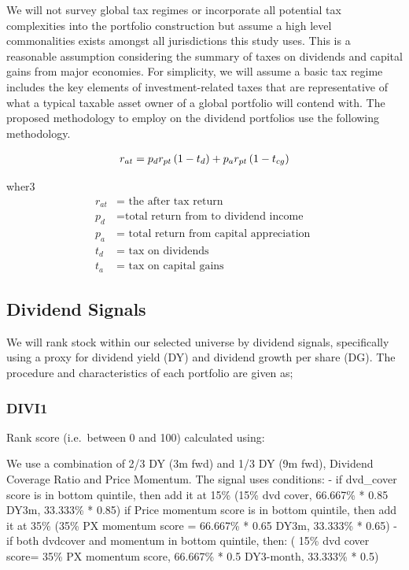 \documentclass[10pt,preprint, authoryear]{elsarticle}
\numberwithin{equation}{section}
\numberwithin{figure}{section}
\numberwithin{table}{section}
\begin{document}
We will not survey global tax regimes or incorporate all potential tax
complexities into the portfolio construction but assume a high level
commonalities exists amongst all jurisdictions this study uses. This is
a reasonable assumption considering the summary of taxes on dividends
and capital gains from major economies. For simplicity, we will assume a
basic tax regime includes the key elements of investment-related taxes
that are representative of what a typical taxable asset owner of a
global portfolio will contend with. The proposed methodology to employ
on the dividend portfolios use the following methodology.

\begin{align}
r_{a t}=p_d r_{p t}\left(1-t_d\right)+p_a r_{p t}\left(1-t_{c g}\right) \notag
\end{align}

wher3 \[
\begin{aligned}
r_{at} & =\text { the after tax return} \\
p_{d} & =\text {total return from to dividend income } \\
p_{a} &= \text { total return from capital appreciation } \\
t_{d}&= \text { tax on dividends}\\
t_{a}& = \text { tax on capital gains }
\end{aligned}
\]

\hypertarget{dividend-signals}{%
\subsection*{Dividend Signals}\label{dividend-signals}}

We will rank stock within our selected universe by dividend signals,
specifically using a proxy for dividend yield (DY) and dividend growth
per share (DG). The procedure and characteristics of each portfolio are
given as;

\hypertarget{divi1}{%
\subsubsection*{DIVI1}\label{divi1}}

Rank score (i.e.~between 0 and 100) calculated using:

We use a combination of 2/3 DY (3m fwd) and 1/3 DY (9m fwd), Dividend
Coverage Ratio and Price Momentum. The signal uses conditions: - if
dvd\_cover score is in bottom quintile, then add it at 15\% (15\% dvd
cover, 66.667\% * 0.85 DY3m, 33.333\% * 0.85) if Price momentum score is
in bottom quintile, then add it at 35\% (35\% PX momentum score =
66.667\% * 0.65 DY3m, 33.333\% * 0.65) - if both dvdcover and momentum
in bottom quintile, then: ( 15\% dvd cover score= 35\% PX momentum
score, 66.667\% * 0.5 DY3-month, 33.333\% * 0.5)
\end{document}
